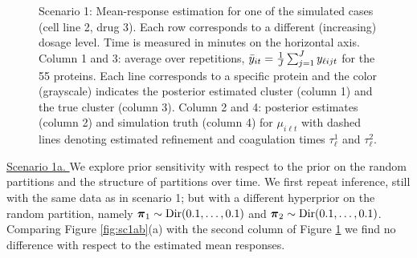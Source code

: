 \begin{figure}[tbp]
\caption{Scenario 1: Mean-response estimation for one of the simulated cases (cell
  line 2, drug 3). Each row corresponds to a different (increasing) dosage level.
  Time is measured in minutes on the horizontal axis.  Column 1 and 3: average over repetitions,
  $\bar{y}_{it} = \frac{1}{J}\sum^J_{j=1}
  y_{\ell ijt}$ for the 55 proteins. Each line corresponds to a specific
  protein and the color (grayscale) indicates the posterior estimated cluster
  (column 1) and the true cluster (column 3).  Column 2 and 4: posterior
  estimates (column 2) and simulation truth (column 4) for $\mu_{i\ell
    t}$ with dashed lines denoting
  estimated refinement and coagulation times $\tau^1_{\ell}$ and
  $\tau^2_{\ell}$. }
 \label{fig:mean_curves_simulation}
\end{figure}

\underline{Scenario 1a. }
We explore prior sensitivity with respect to
the prior on the random partitions and the structure of partitions
over time.
We first repeat inference, still with the same data as in scenario 1; but with a different
hyperprior on the random partition, namely 
$\mbox{\boldmath $\pi$}_1 \sim \mbox{Dir} (0.1, \ldots, 0.1)$ and 
$\mbox{\boldmath $\pi$}_2 \sim \mbox{Dir}(0.1, \ldots, 0.1)$.
Comparing Figure \ref{fig:sc1ab}(a) with the second column of Figure
\ref{fig:mean_curves_simulation} we find no difference with respect to
the estimated mean responses. 


